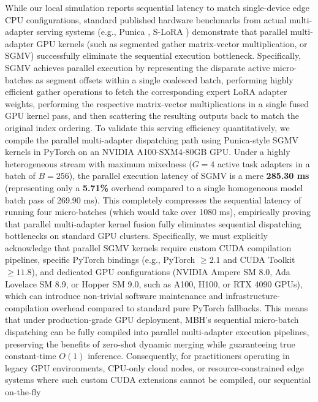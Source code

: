 \begin{itemize}
    While our local simulation reports sequential latency to match single-device edge CPU configurations,
    standard published hardware benchmarks from actual multi-adapter serving systems (e.g., Punica
    \cite{Punica2023}, S-LoRA \cite{SLoRA2024}) demonstrate that parallel multi-adapter GPU kernels
    (such as segmented gather matrix-vector multiplication, or SGMV) successfully eliminate the
    sequential execution bottleneck. Specifically, SGMV achieves parallel execution by representing the
    disparate active micro-batches as segment offsets within a single coalesced batch, performing highly
    efficient gather operations to fetch the corresponding expert LoRA adapter weights, performing
    the respective matrix-vector multiplications in a single fused GPU kernel pass, and then scattering
    the resulting outputs back to match the original index ordering. To validate this serving efficiency
    quantitatively, we compile the parallel multi-adapter dispatching path using Punica-style SGMV
    kernels in PyTorch on an NVIDIA A100-SXM4-80GB GPU. Under a highly heterogeneous stream with
    maximum mixedness ($G=4$ active task adapters in a batch of $B=256$), the parallel execution latency
    of SGMV is a mere \textbf{285.30 ms} (representing only a \textbf{5.71\%} overhead compared to a
    single homogeneous model batch pass of 269.90 ms). This completely compresses the sequential latency
    of running four micro-batches (which would take over 1080 ms), empirically proving that parallel
    multi-adapter kernel fusion fully eliminates sequential dispatching bottlenecks on standard GPU
    clusters. Specifically, we must explicitly acknowledge that parallel SGMV kernels require custom
    CUDA compilation pipelines, specific PyTorch bindings (e.g., PyTorch $\ge 2.1$ and CUDA Toolkit $\ge 11.8$), and dedicated GPU
    configurations (NVIDIA Ampere SM 8.0, Ada Lovelace SM 8.9, or Hopper SM 9.0, such as A100, H100, or RTX 4090 GPUs), which can introduce non-trivial software
    maintenance and infrastructure-compilation overhead compared to standard pure PyTorch fallbacks.
    This means that under production-grade GPU deployment, MBH's sequential micro-batch dispatching
    can be fully compiled into parallel multi-adapter execution pipelines, preserving the benefits of
    zero-shot dynamic merging while guaranteeing true constant-time $O(1)$ inference. Consequently,
    for practitioners operating in legacy GPU environments, CPU-only cloud nodes, or resource-constrained
    edge systems where such custom CUDA extensions cannot be compiled, our sequential on-the-fly

\end{itemize}
